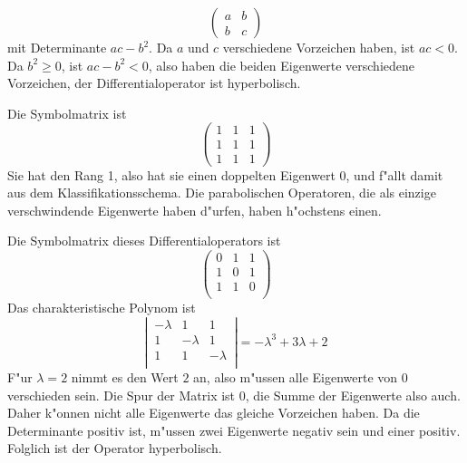 \begin{loesung}
\begin{teilaufgaben}
\[
\begin{pmatrix}a&b\\b&c\end{pmatrix}
\]
mit Determinante $ac-b^2$. Da $a$ und $c$ verschiedene Vorzeichen
haben, ist $ac< 0$. Da $b^2\ge 0$, ist $ac-b^2<0$, also haben
die beiden Eigenwerte verschiedene Vorzeichen, der Differentialoperator
ist hyperbolisch.
\item Die Symbolmatrix ist
\[
\begin{pmatrix}1&1&1\\1&1&1\\1&1&1\end{pmatrix}
\]
Sie hat den Rang 1, also hat sie einen doppelten Eigenwert $0$,
und f"allt damit aus dem Klassifikationsschema. Die parabolischen
Operatoren, die als einzige verschwindende Eigenwerte haben d"urfen,
haben h"ochstens einen.
\item Die Symbolmatrix dieses Differentialoperators ist
\[
\begin{pmatrix}
0&1&1\\
1&0&1\\
1&1&0\\
\end{pmatrix}
\]
Das charakteristische Polynom ist
\[
\left|\,
\begin{matrix}
-\lambda&1&1\\
1&-\lambda&1\\
1&1&-\lambda\\
\end{matrix}
\,\right|
=-\lambda^3+3\lambda+2
\]
F"ur $\lambda=2$ nimmt es den Wert $2$ an, also m"ussen alle Eigenwerte
von $0$ verschieden sein. Die Spur der Matrix ist $0$, die Summe der
Eigenwerte also auch. Daher k"onnen nicht alle Eigenwerte das gleiche
Vorzeichen haben. Da die Determinante positiv ist, m"ussen zwei Eigenwerte
negativ sein und einer positiv. Folglich ist der Operator hyperbolisch.
\end{teilaufgaben}
\end{loesung}
